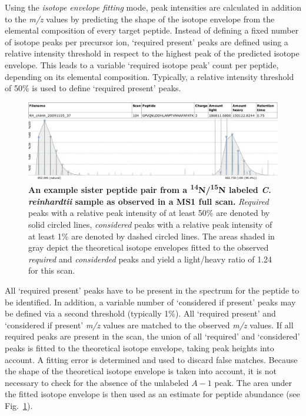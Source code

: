 Using the {\em isotope envelope fitting} mode, peak intensities are calculated in 
addition to the {\em m/z} values by predicting the shape of the 
isotope envelope from the elemental composition of every target peptide. 
Instead of defining a fixed number of isotope peaks per precursor ion, `required
present' peaks are defined using a relative intensity threshold in respect to the
highest peak of the predicted isotope envelope.
This leads to a variable `required isotope peak' count per peptide, depending on 
its elemental composition.
Typically, a relative intensity threshold of 50\% is used to define `required 
present' peaks. 

\begin{figure}
\includegraphics[width=\textwidth]{figures/qtrace-figure.jpg}
\caption{
    {\bf An example sister peptide pair from a 
    \textsuperscript{14}N/\textsuperscript{15}N labeled 
    {\em C. reinhardtii} sample as observed in a MS1 full scan. }
    {\em Required} peaks with a relative peak intensity of at least 50\% are 
    denoted by solid circled lines, {\em considered} peaks with a relative peak 
    intensity of at least 1\% are denoted by dashed circled lines. 
    The areas shaded in gray depict the theoretical isotope envelopes fitted to
    the observed {\em required} and {\em considerded} peaks and yield a light/heavy
    ratio of 1.24 for this scan.}
\label{fig:qtrace}
\end{figure}

All `required present' peaks have to be present in the spectrum for the peptide 
to be identified.
In addition, a variable number of `considered if present' peaks may be defined
via a second threshold (typically 1\%). 
All `required present' and `considered if present' {\em m/z} values are matched 
to the observed {\em m/z} values.
If all required peaks are present in the scan, the union of all `required' and
`considered' peaks is fitted to the theoretical isotope envelope, taking peak
heights into account.
A fitting error is determined and used to discard false matches.
Because the shape of the theoretical isotope envelope is taken into account, 
it is not necessary to check for the absence of the unlabeled $A-1$ peak.
The area under the fitted isotope envelope is then used as an estimate for
peptide abundance (see Fig.~\ref{fig:qtrace}).

